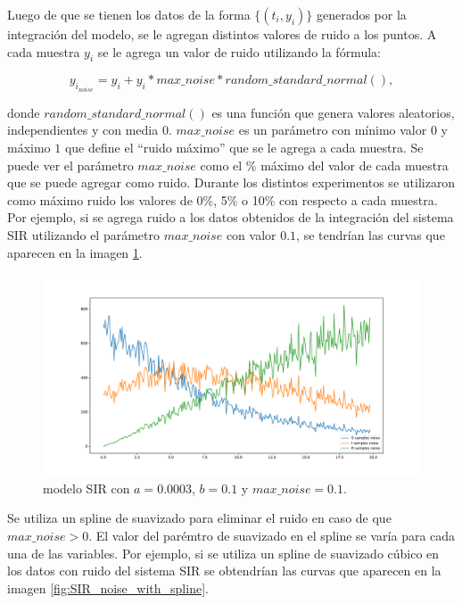 Luego de que se tienen los datos de la forma $\{(t_i, y_i)\}$ generados por la integración del modelo, se le agregan distintos valores de ruido a los puntos. A cada muestra $y_i$ se le agrega un valor de ruido utilizando la fórmula:

$$y_{i_{noise}} = y_i + y_i * max\_noise * random\_standard\_normal(),$$

donde $random\_standard\_normal()$ es una función que genera valores aleatorios, independientes y con media 0. $max\_noise$ es un parámetro con mínimo valor $0$ y máximo $1$ que define el ``ruido  máximo'' que se le agrega a cada muestra. Se puede ver el parámetro $max\_noise$ como el \% máximo del valor de cada muestra que se puede agregar como ruido. Durante los distintos experimentos se utilizaron como máximo ruido los valores de 0\%, 5\% o 10\% con respecto a cada muestra. Por ejemplo, si se agrega ruido a los datos obtenidos de la integración del sistema SIR utilizando el parámetro $max\_noise$ con valor $0.1$, se tendrían las curvas que aparecen en la imagen \ref{fig:SIR_with_noise}.

\begin{figure}[h]
    \centering
    \includegraphics[width=\textwidth]{"figures/SIR_with_noise.pdf"}
    \caption{modelo SIR con $a = 0.0003$, $b = 0.1$ y $max\_noise = 0.1$.}
    \label{fig:SIR_with_noise}
\end{figure}

Se utiliza un spline de suavizado para eliminar el ruido en caso de que $max\_noise > 0$. El valor del parémtro de suavizado en el spline se varía para cada una de las variables. Por ejemplo, si se utiliza un spline de suavizado cúbico en los datos con ruido del sistema SIR se obtendrían las curvas que aparecen en la imagen \ref{fig:SIR_noise_with_spline}.


